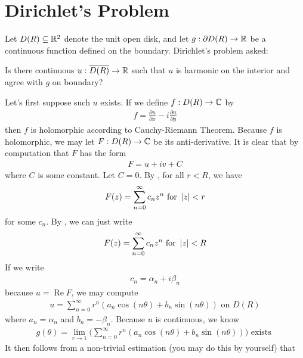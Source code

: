 \documentclass{report}
\begin{document}
\section{Dirichlet's Problem}
\begin{mdframed}
Let $D(R)\subseteq \mathbb{R}^2$ denote the unit open disk, and let $g:\partial D(R) \rightarrow \mathbb{R}$ be a  continuous function defined on the boundary. Dirichlet's problem asked: 
\begin{center}
   \begin{minipage}{0.9\linewidth}  
Is there continuous $u: \overline{D(R)}\rightarrow \mathbb{R}$ such that $u$ is harmonic on the interior and agree with $g$ on boundary? 
   \end{minipage}
\end{center}
Let's first suppose such $u$ exists. If we define $f:D(R)\rightarrow \mathbb{C}$ by 
\begin{align*}
f= \frac{\partial u}{\partial x}- i \frac{\partial u}{\partial y}
\end{align*}
then $f$ is holomorphic according to Cauchy-Riemann Theorem. Because $f$ is holomorphic, we may let $F:D(R)\rightarrow \mathbb{C}$ be its anti-derivative. It is clear that by computation that $F$ has the form
\begin{align*}
F= u+iv +C
\end{align*}
where $C$ is some constant. Let $C=0$. By , for all $r<R$, we have 
 \begin{align*}
F(z)= \sum_{n=0}^{\infty} c_n z^n \text{ for }\left|z\right|<r
\end{align*}
for some $c_n$. By , we can just write 
\begin{align*}
F(z)=\sum_{n=0}^{\infty} c_nz^n \text{ for }\left|z\right|<R
\end{align*}
If we write 
 \begin{align*}
c_n = \alpha _n + i \beta _n 
\end{align*}
because $u=\operatorname{Re}F$, we may compute 
\begin{align*}
u= \sum_{n=0}^{\infty} r^n (a_n \cos (n\theta)+b_n \sin (n \theta))\text{ on }D(R)
\end{align*}
where $a_n=\alpha_n$ and $b_n=-\beta_n$. Because $u$ is continuous, we know 
 \begin{align}
\label{lk}
g(\theta)=\lim_{r\to 1} \Big(\sum_{n=0}^{\infty}r^n (a_n \cos (n \theta)+ b_n \sin (n\theta)) \Big)\text{ exists }
\end{align}
It then follows from a non-trivial estimation (you may do this by yourself) that 

\end{mdframed}
\end{document}

